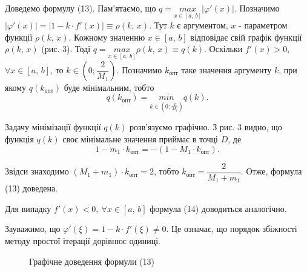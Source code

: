 \documentclass[14pt,a4paper,titlepage]{extarticle}
\begin{document}
Доведемо формулу (13). Пам'ятаємо, що $q=\underset{x\in [a,\, b]}{max}\left|\varphi'(x)\right|$. Позначимо $\left|\varphi'(x)\right|=\left|1-k\cdot f'(x)\right|\equiv\rho(k,\,x)$. Тут $k$ є аргументом, $x$ - параметром функції $\rho(k,\,x)$. Кожному значенню $x\in[a,\, b]$ відповідає свій графік функції $\rho(k,\,x)$ (рис. 3). Тоді $q=\underset{x\in [a,\, b]}{max}\rho(k,\,x)\equiv q(k)$. Оскільки $f'(x)>0$, $\forall x\in[a,\, b]$, то $k\in\left(0;\dfrac{2}{M_1}\right)$. Позначимо $k_{\text{опт}}$ таке значення аргументу $k$, при якому  
$q(k_{\text{опт}})$ буде мінімальним, тобто
$$
q(k_{\text{опт}})=\underset{k\in\left(0;\frac{2}{M_1}\right)}{min}q(k).
$$

Задачу мінімізації функції $q(k)$ розв'язуємо графічно. З рис. 3 видно, що функція $q(k)$ своє мінімальне значення приймає в точці $D$, де
$$
1-m_1\cdot k_{\text{опт}}=-(1-M_1\cdot k_{\text{опт}}).
$$

Звідси знаходимо $(M_1+m_1)\cdot k_{\text{опт}}=2$, тобто $k_{\text{опт}}=\dfrac{2}{M_1+m_1}$. Отже, формула (13) доведена.

Для випадку $f'(x)<0,\ \forall x\in[a,\, b]$ формула (14) доводиться аналогічно.

Зауважимо, що $\varphi'(\xi)=1-k\cdot f'(\xi)\neq0$. Це означає, що порядок збіжності методу простої ітерації дорівнює одиниці.
\begin{figure}[h]
\caption{Графічне доведення формули (13)}
\end{figure}
\end{document}

